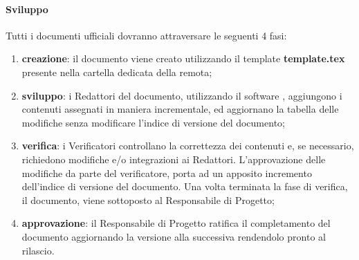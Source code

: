 		\paragraph{Sviluppo}
		Tutti i documenti ufficiali dovranno attraversare le seguenti 4 fasi:
		\begin{enumerate}
			\item \textbf{creazione}: il documento viene creato utilizzando il template \textbf{template.tex} presente nella cartella dedicata della  remota;
			\item \textbf{sviluppo}: i Redattori del documento, utilizzando il software , aggiungono i contenuti assegnati in maniera incrementale, ed aggiornano la tabella delle modifiche senza modificare l'indice di versione del documento;
			\item \textbf{verifica}: i Verificatori controllano la correttezza dei contenuti e, se necessario, richiedono modifiche e/o integrazioni ai Redattori. L'approvazione delle modifiche da parte del verificatore, porta ad un apposito incremento dell'indice di versione del documento. Una volta terminata la fase di verifica, il documento, viene sottoposto al Responsabile di Progetto;
			\item \textbf{approvazione}: il Responsabile di Progetto ratifica il completamento del documento aggiornando la versione alla  successiva rendendolo pronto al rilascio.
		\end{enumerate}
		
